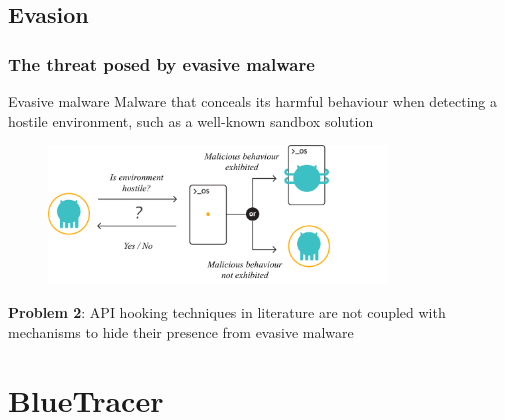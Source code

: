 \documentclass[compress]{beamer}
\begin{document}
\subsection{Evasion}

\begin{frame}
    \frametitle{The threat posed by evasive malware}
	
		    \begin{beamerboxesrounded}[shadow=true]{Evasive malware}
Malware that conceals its harmful behaviour when detecting a
hostile environment, such as a well-known sandbox
solution
    \end{beamerboxesrounded}
    \bigskip
    
    \begin{figure}
    	\vspace{-0.2cm}
    	\hspace*{1cm}
        \includegraphics[width=9cm]{image/evasive.pdf}
    \end{figure}
    
    \textbf{Problem 2}: API hooking techniques in literature are not coupled with mechanisms to hide their presence from evasive malware


\end{frame}

\section{BlueTracer}
\end{document}
